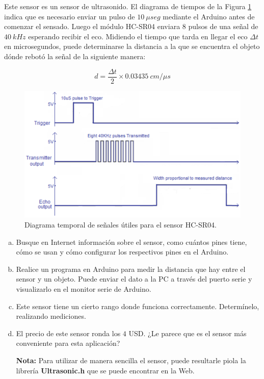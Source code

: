 \documentclass[a4paper,10pt]{article}
\begin{document}
Este sensor es un sensor de ultrasonido. El diagrama de tiempos de la Figura \ref{HC} indica que es necesario enviar un pulso de $10\ \mu seg$ mediante el Arduino antes de comenzar
el sensado. Luego el módulo HC-SR04 enviara $8$ pulsos de una señal de $40\ kHz$ esperando recibir el eco. Midiendo el tiempo 
que tarda en llegar el eco $\Delta t$ en microsegundos, puede determinarse la distancia a la que se encuentra el objeto dónde rebotó la señal de la siguiente manera:

\begin{equation*}
  d = \frac{\Delta t}{2} \times 0.03435\ cm/\mu s
\end{equation*}


\begin{figure}[h]
\centering
\includegraphics[width=0.7 \textwidth]{HC.eps}
\caption{Diagrama temporal de señales útiles para el sensor HC-SR04.}
\label{HC}
\end{figure}


\begin{enumerate}[(a)]
	\item Busque en Internet información sobre el sensor, como cuántos pines tiene, cómo se usan y cómo configurar los respectivos pines en el Arduino.
	\item Realice un programa en Arduino para medir la distancia que hay entre el sensor y un objeto. Puede enviar el dato a la PC a través del puerto serie y visualizarlo en el monitor serie de Arduino.
	\item Este sensor tiene un cierto rango donde funciona correctamente. Determínelo, realizando mediciones.
	\item El precio de este sensor ronda los $4 $ USD. ¿Le parece que es el sensor más conveniente para esta aplicación? 

\textbf{Nota:} Para utilizar de manera sencilla el sensor, puede resultarle piola la librería \textbf{Ultrasonic.h} que se puede encontrar en la Web. 

\end{enumerate}
\end{document}

